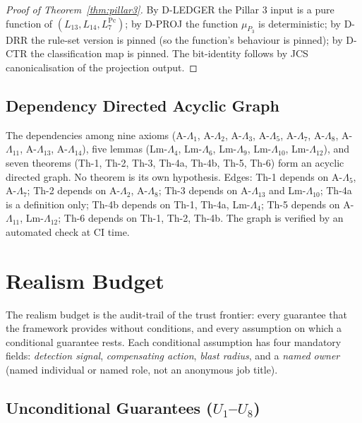\documentclass[11pt,a4paper]{article}
\begin{document}
\begin{proof}[Proof of Theorem~\ref{thm:pillar3}]
By D-LEDGER the Pillar 3 input is a pure function of $(L_{13}, L_{14}, L_7^{\mathrm{Pc}})$; by D-PROJ the function $\mu_{P_3}$ is deterministic; by D-DRR the rule-set version is pinned (so the function's behaviour is pinned); by D-CTR the classification map is pinned. The bit-identity follows by JCS canonicalisation of the projection output. \qedhere
\end{proof}

\subsection{Dependency Directed Acyclic Graph}
\label{sec:thm-dag}

The dependencies among nine axioms (A-$\Lambda_1$, A-$\Lambda_2$, A-$\Lambda_3$, A-$\Lambda_5$, A-$\Lambda_7$, A-$\Lambda_8$, A-$\Lambda_{11}$, A-$\Lambda_{13}$, A-$\Lambda_{14}$), five lemmas (Lm-$\Lambda_4$, Lm-$\Lambda_6$, Lm-$\Lambda_9$, Lm-$\Lambda_{10}$, Lm-$\Lambda_{12}$), and seven theorems (Th-1, Th-2, Th-3, Th-4a, Th-4b, Th-5, Th-6) form an acyclic directed graph. No theorem is its own hypothesis. Edges: Th-1 depends on A-$\Lambda_5$, A-$\Lambda_7$; Th-2 depends on A-$\Lambda_2$, A-$\Lambda_8$; Th-3 depends on A-$\Lambda_{13}$ and Lm-$\Lambda_{10}$; Th-4a is a definition only; Th-4b depends on Th-1, Th-4a, Lm-$\Lambda_4$; Th-5 depends on A-$\Lambda_{11}$, Lm-$\Lambda_{12}$; Th-6 depends on Th-1, Th-2, Th-4b. The graph is verified by an automated check at CI time.

\clearpage
\section{Realism Budget}
\label{sec:realism}

The realism budget is the audit-trail of the trust frontier: every guarantee that the framework provides without conditions, and every assumption on which a conditional guarantee rests. Each conditional assumption has four mandatory fields: \emph{detection signal}, \emph{compensating action}, \emph{blast radius}, and a \emph{named owner} (named individual or named role, not an anonymous job title).

\subsection{Unconditional Guarantees ($U_1$--$U_8$)}
\label{sec:realism-uncond}
\end{document}
